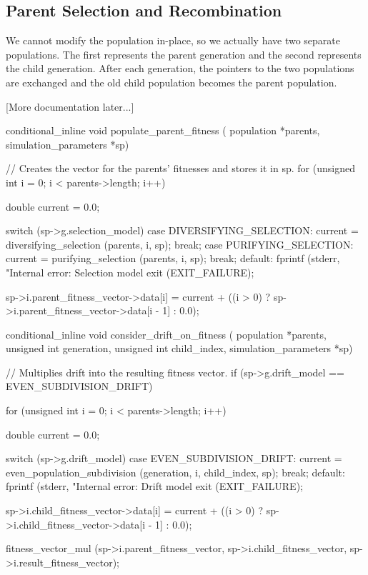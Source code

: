 \documentclass{article}
\begin{document}
    \subsection{Parent Selection and Recombination}

      We cannot modify the population in-place, so we actually have two separate
      populations. The first represents the parent generation and the second
      represents the child generation. After each generation, the pointers to
      the two populations are exchanged and the old child population becomes the
      parent population.

      [More documentation later...]

\begin{ccode}
conditional_inline void populate_parent_fitness (
			  population *parents, simulation_parameters *sp) {
  // Creates the vector for the parents' fitnesses and stores it in sp.
  for (unsigned int i = 0; i < parents->length; i++) {
    double current = 0.0;

    switch (sp->g.selection_model) {
      case DIVERSIFYING_SELECTION:
	current = diversifying_selection (parents, i, sp);
	break;
      case PURIFYING_SELECTION:
	current = purifying_selection (parents, i, sp);
	break;
      default:
	fprintf (stderr, "Internal error: Selection model %
	exit (EXIT_FAILURE);
    }

    sp->i.parent_fitness_vector->data[i] = current +
      ((i > 0) ? sp->i.parent_fitness_vector->data[i - 1] : 0.0);
  }
}

conditional_inline void consider_drift_on_fitness (
			  population *parents, unsigned int generation,
			  unsigned int child_index, simulation_parameters *sp) {
  // Multiplies drift into the resulting fitness vector.
  if (sp->g.drift_model == EVEN_SUBDIVISION_DRIFT) {
    for (unsigned int i = 0; i < parents->length; i++) {
      double current = 0.0;

      switch (sp->g.drift_model) {
	case EVEN_SUBDIVISION_DRIFT:
	  current = even_population_subdivision (generation, i, child_index, sp);
	  break;
	default:
	  fprintf (stderr, "Internal error: Drift model %
	  exit (EXIT_FAILURE);
      }

      sp->i.child_fitness_vector->data[i] = current +
	((i > 0) ? sp->i.child_fitness_vector->data[i - 1] : 0.0);
    }

    fitness_vector_mul (sp->i.parent_fitness_vector, sp->i.child_fitness_vector,
			sp->i.result_fitness_vector);
  }
}


\end{ccode}
\end{document}
